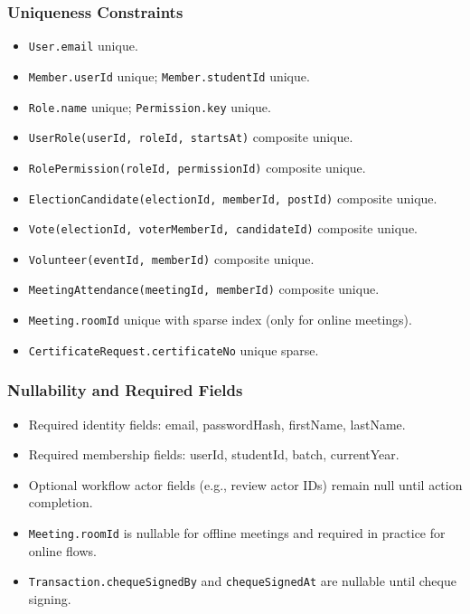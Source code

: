 \documentclass[12pt,a4paper]{article}
\begin{document}
\subsubsection{Uniqueness Constraints}
\begin{itemize}[noitemsep]
  \item \texttt{User.email} unique.
  \item \texttt{Member.userId} unique; \texttt{Member.studentId} unique.
  \item \texttt{Role.name} unique; \texttt{Permission.key} unique.
  \item \texttt{UserRole(userId, roleId, startsAt)} composite unique.
  \item \texttt{RolePermission(roleId, permissionId)} composite unique.
  \item \texttt{ElectionCandidate(electionId, memberId, postId)} composite unique.
  \item \texttt{Vote(electionId, voterMemberId, candidateId)} composite unique.
  \item \texttt{Volunteer(eventId, memberId)} composite unique.
  \item \texttt{MeetingAttendance(meetingId, memberId)} composite unique.
  \item \texttt{Meeting.roomId} unique with sparse index (only for online meetings).
  \item \texttt{CertificateRequest.certificateNo} unique sparse.
\end{itemize}

\subsubsection{Nullability and Required Fields}
\begin{itemize}[noitemsep]
  \item Required identity fields: email, passwordHash, firstName, lastName.
  \item Required membership fields: userId, studentId, batch, currentYear.
  \item Optional workflow actor fields (e.g., review actor IDs) remain null until action completion.
  \item \texttt{Meeting.roomId} is nullable for offline meetings and required in practice for online flows.
  \item \texttt{Transaction.chequeSignedBy} and \texttt{chequeSignedAt} are nullable until cheque signing.
\end{itemize}
\end{document}

